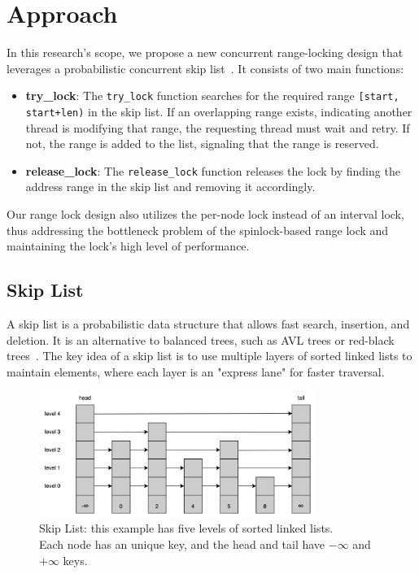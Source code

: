 
\chapter{Approach}\label{chapter:approach}

In this research's scope, we propose a new concurrent range-locking design that leverages a probabilistic concurrent skip list~\parencite{herlihy2006provably, herlihy2020art}. It consists of two main functions:
\begin{itemize}
    \item \textbf{try\_lock}: The \texttt{try\_lock} function searches for the required range \texttt{[start, start+len)} in the skip list. If an overlapping range exists, indicating another thread is modifying that range, the requesting thread must wait and retry. If not, the range is added to the list, signaling that the range is reserved.
    \item \textbf{release\_lock}: The \texttt{release\_lock} function releases the lock by finding the address range in the skip list and removing it accordingly.
\end{itemize} 

Our range lock design also utilizes the per-node lock instead of an interval lock, thus addressing the bottleneck problem of the spinlock-based range lock and maintaining the lock's high level of performance. 

\section{Skip List}

A skip list is a probabilistic data structure that allows fast search, insertion, and deletion. It is an alternative to balanced trees, such as AVL trees or red-black trees~\parencite{pugh1990skip, pugh1990skip2}. The key idea of a skip list is to use multiple layers of sorted linked lists to maintain elements, where each layer is an "express lane" for faster traversal.

\begin{figure}[h]
    \centering
    \includegraphics[width=0.8\textwidth]{./figures/skiplist.jpg}
    \caption{Skip List: this example has five levels of sorted linked lists. \\
    Each node has an unique key, and the head and tail have $-\infty$ and $+\infty$ keys.}
    \label{fig:skiplist}
\end{figure}

